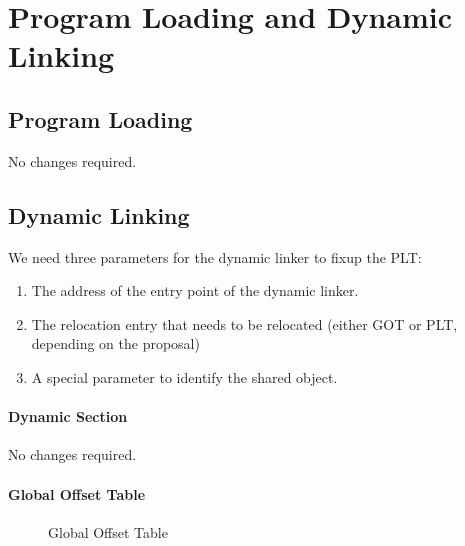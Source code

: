 \chapter{Program Loading and Dynamic Linking}


\section{Program Loading}

No changes required.


\section{Dynamic Linking}

We need three parameters for the dynamic linker to fixup the
PLT:
\begin{enumerate}
\item The address of the entry point of the dynamic linker.
\item The relocation entry that needs to be relocated (either GOT or
  PLT, depending on the proposal)
\item A special parameter to identify the shared object.
\end{enumerate}



\subsubsection{Dynamic Section}

No changes required.

\subsubsection{Global Offset Table}



\begin{figure}[H]
\caption{Global Offset Table}
\begin{center}
\end{center}
\end{figure}

